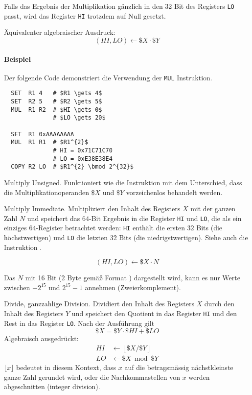 Falls das Ergebnis der Multiplikation gänzlich in den 32 Bit des Registers
\texttt{LO} passt, wird das Register \texttt{HI} trotzdem auf Null gesetzt.

Äquivalenter algebraischer Ausdruck:
\[
    (HI, LO) \gets \$X \cdot \$Y
\]

\paragraph{Beispiel} Der folgende Code demonstriert die Verwendung der
\texttt{MUL} Instruktion.
\begin{lstlisting}
  SET  R1 4   # $R1 \gets 4$
  SET  R2 5   # $R2 \gets 5$
  MUL  R1 R2  # $HI \gets 0$
              # $LO \gets 20$

  SET  R1 0xAAAAAAAA
  MUL  R1 R1  # $R1^{2}$
              # HI = 0x71C71C70
              # LO = 0xE38E38E4 
  COPY R2 LO  # $R1^{2} \bmod 2^{32}$ 
\end{lstlisting}



\glqq Multiply Unsigned\grqq.
Funktioniert wie die Instruktion  mit dem Unterschied, dass die
Multiplikationoperanden $\$X$ und $\$Y$ vorzeichenlos behandelt werden. 



\glqq Multiply Immediate\grqq.
Multipliziert den Inhalt des Registers $X$ mit der ganzen Zahl $N$ und speichert
das $64$-Bit Ergebnis in die Register \texttt{HI} und \texttt{LO}, die als ein
einziges $64$-Register betrachtet werden: \texttt{HI} enthält die ersten $32$
Bits (die höchstwertigen) und \texttt{LO} die letzten 32 Bits (die
niedrigstwertigen).
Siehe auch die Instruktion .

\[
   (HI, LO) \gets \$X \cdot N
\]

Das $N$ mit 16 Bit (2 Byte gemäß Format ) dargestellt wird, kann
es nur Werte zwischen $-2^{15}$ und $2^{15} - 1$ annehmen (Zweierkomplement).



\glqq Divide\grqq, ganzzahlige Division.
Dividiert den Inhalt des Registers $X$ durch den Inhalt des Registers $Y$ und
speichert den Quotient in das Register \texttt{HI} und den Rest in das Register
\texttt{LO}.
Nach der Ausführung gilt
\[
    \$X = \$Y \cdot \$HI + \$LO
\]
Algebraisch ausgedrückt:
\begin{align*}
  HI & \gets \left\lfloor \$X/\$Y \right\rfloor \\
  LO & \gets \$X \bmod \$Y
\end{align*}
$\lfloor x \rfloor$ bedeutet in diesem Kontext, dass $x$ auf die betragsmässig
nächstkleinste ganze Zahl gerundet wird, oder die Nachkommastellen von $x$
werden abgeschnitten (integer division).


